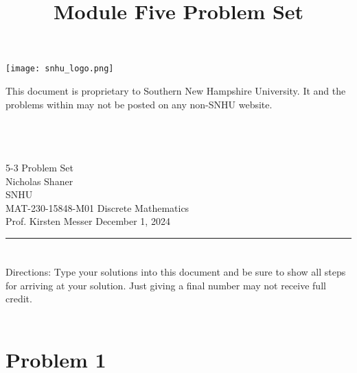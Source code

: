 \documentclass{amsart}
\theoremstyle{definition}
\theoremstyle{Exercise}
\theoremstyle{remark}
\theoremstyle{rule}
\numberwithin{equation}{section}
\begin{document}
\begin{center}
\texttt{[image: snhu\_logo.png]}
\end{center}
\title{\sf Module Five Problem Set}%


\maketitle
This document is proprietary to Southern New Hampshire University. It and the problems within may not be posted on any non-SNHU website.\\\\\\\\
\begin{center}\doublespacing
5-3 Problem Set\\
Nicholas Shaner\\
SNHU\\
MAT-230-15848-M01 Discrete Mathematics\\
Prof. Kirsten Messer December 1, 2024\\
\end{center}


\begin{center}
\rule{\textwidth}{0.4pt}
\end{center}


\newpage

\section*{}
\section*{}
Directions: Type your solutions into this document and be sure to show all steps for arriving at your solution. Just giving a final number may not receive full credit.
\\\\
\section*{Problem 1}
\end{document}
